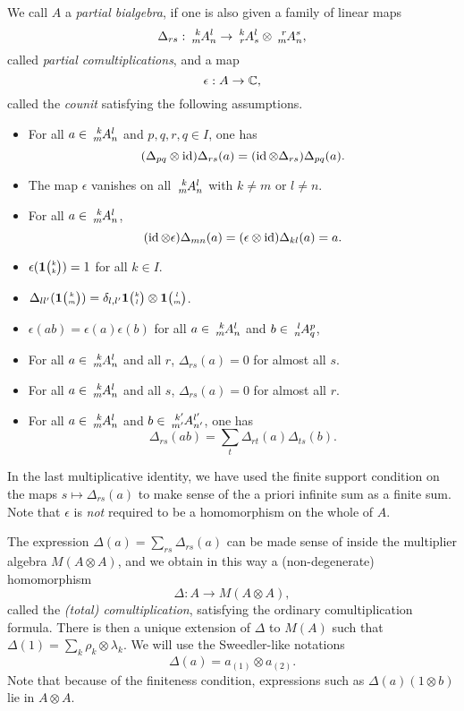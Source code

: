 We call $A$ a \emph{partial bialgebra}, \cite[Definition 1.5]{DCT1} if one is also given a family of linear maps \[\Delta_{rs}: \Gr{A}{k}{l}{m}{n}\rightarrow \Gr{A}{k}{l}{r}{s} \otimes \Gr{A}{r}{s}{m}{n},\] called \emph{partial comultiplications}, and a map \[\epsilon: A \rightarrow \mathbb{C},\] called the \emph{counit} satisfying the following assumptions.
\begin{itemize}
\item For all $a\in \Gr{A}{k}{l}{m}{n}$ and $p,q,r,q\in I$, one has \[(\Delta_{pq}\otimes \operatorname{id})\Delta_{rs}(a) = (\operatorname{id}\otimes \Delta_{rs})\Delta_{pq}(a).\]
\item The map $\epsilon$ vanishes on all $\Gr{A}{k}{l}{m}{n}$ with $k\neq m$ or $l\neq n$. 
\item For all $a\in \Gr{A}{k}{l}{m}{n}$, \[(\operatorname{id}\otimes \epsilon)\Delta_{mn}(a) = (\epsilon\otimes \operatorname{id})\Delta_{kl}(a) = a.\]
\item $\epsilon(\mathbf{1}{\tiny {\begin{pmatrix} k\\k\end{pmatrix}}})= 1$ for all $k\in I$. 
\item $\Delta_{ll'}(\mathbf{1}{\tiny {\begin{pmatrix} k\\m\end{pmatrix}}}) = \delta_{l,l'} \mathbf{1}{\tiny {\begin{pmatrix} k\\l\end{pmatrix}}}\otimes \mathbf{1}{\tiny {\begin{pmatrix} l\\m\end{pmatrix}}}$.
\item $\epsilon(ab) = \epsilon(a)\epsilon(b)$ for all $a\in \Gr{A}{k}{l}{m}{n}$ and $b\in \Gr{A}{l}{p}{n}{q}$,
\item For all $a\in \Gr{A}{k}{l}{m}{n}$ and all $r$, $\Delta_{rs}(a)=0$ for almost all $s$.
\item For all $a\in \Gr{A}{k}{l}{m}{n}$ and all $s$, $\Delta_{rs}(a)=0$ for almost all $r$.
\item For all $a\in \Gr{A}{k}{l}{m}{n}$ and $b\in \Gr{A}{k'}{l'}{m'}{n'}$, one has \[\Delta_{rs}(ab) = \sum_{t} \Delta_{rt}(a)\Delta_{ts}(b).\]
\end{itemize} 

In the last multiplicative identity, we have used the finite support condition on the maps $s\mapsto \Delta_{rs}(a)$ to make sense of the a priori infinite sum as a finite sum. Note that $\epsilon$ is \emph{not} required to be a homomorphism on the whole of $A$.

The expression $\Delta(a) = \sum_{rs}\Delta_{rs}(a)$ can be made sense of inside the multiplier algebra $M(A\otimes A)$, and we obtain in this way a (non-degenerate) homomorphism \[\Delta: A\rightarrow M(A\otimes A),\] called the \emph{(total) comultiplication}, satisfying the ordinary comultiplication formula. There is then a unique extension of $\Delta$ to $M(A)$ such that $\Delta(1) =\sum_k \rho_k\otimes \lambda_k$. We will use the Sweedler-like notations \[\Delta(a) = a_{(1)}\otimes a_{(2)}.\] Note that because of the finiteness condition, expressions such as $\Delta(a)(1\otimes b)$ lie in $A\otimes A$.

